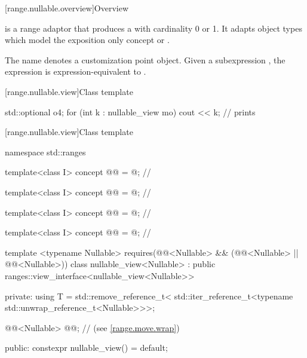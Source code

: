\documentclass[a4paper,10pt,oneside,openany,final,article]{memoir}
\begin{document}
\begin{wording}
[range.nullable.overview]{Overview}

\pnum
{} is a range adaptor that produces a  with cardinality 0 or 1. It adapts object types which model the exposition only concept  or .


\pnum
{}%
The name  denotes a
customization point object.
Given a subexpression , the expression
 is expression-equivalent to
.

[range.nullable.view]{Class template }

\begin{example}
  \begin{codeblock}
    std::optional o{4};
    for (int k : nullable_view m{o})
      cout << k;        // prints 
  \end{codeblock}
\end{example}

[range.nullable.view]{Class template }

\begin{codeblock}
namespace std::ranges {
  template<class I>
  concept @@ = @\seebelownc@;  // \expos

  template<class I>
    concept @@ = @\seebelownc@;  // \expos

  template<class I>
    concept @@ = @\seebelownc@;  // \expos

  template<class I>
    concept @@ = @\seebelownc@;    // \expos

  template <typename Nullable>
    requires(@@<Nullable> &&
      (@@<Nullable> || @@<Nullable>))
  class nullable_view<Nullable>
    : public ranges::view_interface<nullable_view<Nullable>> {
  private:
    using T = std::remove_reference_t<
        std::iter_reference_t<typename std::unwrap_reference_t<Nullable>>>;

    @@<Nullable> @@; // \expos{} (see \ref{range.move.wrap})

  public:
    constexpr nullable_view() = default;

}}
\end{codeblock}
\end{wording}
\end{document}
